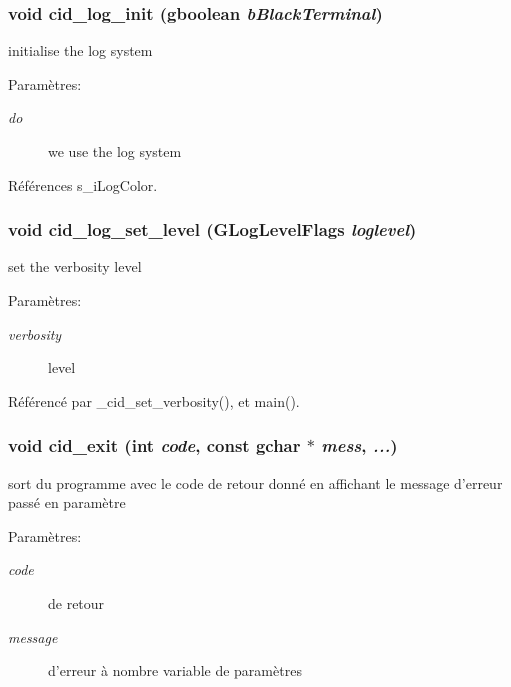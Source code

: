 \subsubsection{\setlength{\rightskip}{0pt plus 5cm}void cid\_\-log\_\-init (gboolean {\em bBlackTerminal})}\label{cid-messages_8c_6aed9a1a5cbf05c3cb5ff4a34e3e3c14}


initialise the log system \begin{Desc}
\item[Paramètres:]
\begin{description}
\item[{\em do}]we use the log system \end{description}
\end{Desc}


Références s\_\-iLogColor.
\subsubsection{\setlength{\rightskip}{0pt plus 5cm}void cid\_\-log\_\-set\_\-level (GLogLevelFlags {\em loglevel})}\label{cid-messages_8c_9f6543baa01f0cd02d43abcafbc667d4}


set the verbosity level \begin{Desc}
\item[Paramètres:]
\begin{description}
\item[{\em verbosity}]level \end{description}
\end{Desc}


Référencé par \_\-cid\_\-set\_\-verbosity(), et main().
\subsubsection{\setlength{\rightskip}{0pt plus 5cm}void cid\_\-exit (int {\em code}, \/  const gchar $\ast$ {\em mess}, \/   {\em ...})}\label{cid-messages_8c_a884a28c1f60af6eed13da9bb191dd25}


sort du programme avec le code de retour donné en affichant le message d'erreur passé en paramètre \begin{Desc}
\item[Paramètres:]
\begin{description}
\item[{\em code}]de retour \item[{\em message}]d'erreur à nombre variable de paramètres \end{description}
\end{Desc}


